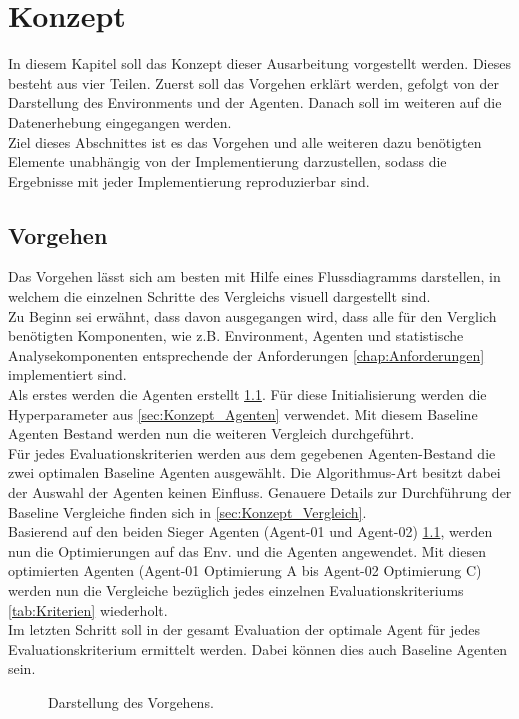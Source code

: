 \chapter{Konzept}
In diesem Kapitel soll das Konzept dieser Ausarbeitung vorgestellt werden. Dieses besteht aus vier Teilen. Zuerst soll das Vorgehen erklärt werden, gefolgt von der Darstellung des Environments und der Agenten. Danach soll im weiteren auf die Datenerhebung eingegangen werden.\\
Ziel dieses Abschnittes ist es das Vorgehen und alle weiteren dazu benötigten Elemente unabhängig von der Implementierung darzustellen, sodass die Ergebnisse mit jeder Implementierung reproduzierbar sind.

\section{Vorgehen} \label{sec:Vorgehen}
Das Vorgehen lässt sich am besten mit Hilfe eines Flussdiagramms darstellen, in welchem die einzelnen Schritte des Vergleichs visuell dargestellt sind.\\
Zu Beginn sei erwähnt, dass davon ausgegangen wird, dass alle für den Verglich benötigten Komponenten, wie z.B. Environment, Agenten und statistische Analysekomponenten entsprechende der Anforderungen \ref{chap:Anforderungen} implementiert sind.\\
Als erstes werden die Agenten erstellt \ref{fig:Vorgehen}. Für diese Initialisierung werden die Hyperparameter aus \ref{sec:Konzept_Agenten} verwendet.
Mit diesem Baseline Agenten Bestand werden nun die weiteren Vergleich durchgeführt.\\
Für jedes Evaluationskriterien werden aus dem gegebenen Agenten-Bestand die zwei optimalen Baseline Agenten ausgewählt. Die Algorithmus-Art besitzt dabei der Auswahl der Agenten keinen Einfluss. Genauere Details zur Durchführung der Baseline Vergleiche finden sich in \ref{sec:Konzept_Vergleich}.\\
Basierend auf den beiden Sieger Agenten (Agent-01 und Agent-02) \ref{fig:Vorgehen}, werden nun die Optimierungen auf das Env. und die Agenten angewendet. Mit diesen optimierten Agenten (Agent-01 Optimierung A bis Agent-02 Optimierung C) werden nun die Vergleiche bezüglich jedes einzelnen Evaluationskriteriums \ref{tab:Kriterien} wiederholt.\\
Im letzten Schritt soll in der gesamt Evaluation der optimale Agent für jedes Evaluationskriterium ermittelt werden. Dabei können dies auch Baseline Agenten sein.
\begin{figure}[H]
	\centering
	\def\svgscale{0.095}
	
	\caption[Flussdiagramm des Vorgehens]{Darstellung des Vorgehens.}
	\label{fig:Vorgehen}
\end{figure}


